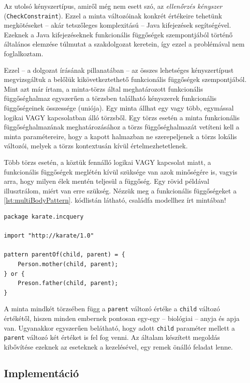 \begin{sloppypar}
Az utolsó kényszertípus, amiről még nem esett szó, az \emph{ellenőrzés kényszer} (\texttt{CheckConstraint}).
Ezzel a minta változóinak konkrét értékeire tehetünk megkötéseket -- akár tetszőleges komplexitású -- Java kifejezések segítségével.
Ezeknek a Java kifejezéseknek funkcionális függőségek szempontjából történő általános elemzése túlmutat a szakdolgozat keretein, így ezzel a problémával nem foglalkoztam.
\end{sloppypar}

Ezzel -- a dolgozat írásának pillanatában -- az összes lehetséges kényszertípust megvizsgáltuk a belőlük kikövetkeztethető funkcionális függőségek szempontjából.
Mint azt már írtam, a minta-törzs által meghatározott funkcionális függőséghalmaz egyszerűen a törzsben található kényszerek funkcionális függőségeinek összessége (uniója).
Egy minta állhat egy vagy több, egymással logikai VAGY kapcsolatban álló törzsből.
Egy törzs esetén a minta funkcionális függőséghalmazának meghatározásához a törzs függőséghalmazát vetíteni kell a minta paramétereire, hogy a kapott halmazban ne szerepeljenek a törzs lokális változói, melyek a törzs kontextusán kívül értelmezhetetlenek.

Több törzs esetén, a köztük fennálló logikai VAGY kapcsolat miatt, a funkcionális függőségek meglétén kívül szüksége van azok minőségére is, vagyis arra, hogy milyen élek mentén teljesül a függőség.
Egy rövid példával illusztrálom, miért van erre szükség.
Nézzük meg a funkcionális függőségeket a \ref{lst:multiBodyPattern}. kódlistán látható, családfa modellhez írt mintában!
\begin{lstlisting}[float,floatplacement=htb,caption=Példa több törzsű mintára,label=lst:multiBodyPattern]
package karate.incquery

import "http://karate/1.0"

pattern parentOf(child, parent) = {
    Person.mother(child, parent);
} or {
    Preson.father(child, parent);
}
\end{lstlisting}
A minta mindkét törzsében függ a \texttt{parent} változó értéke a \texttt{child} változó értékétől, hiszen minden embernek pontosan egy-egy -- biológiai -- anyja és apja van. Ugyanakkor egyszerűen belátható, hogy adott \texttt{child} paraméter mellett a \texttt{parent} változó két értéket is fel fog venni.
Az általam készített megoldás kibővítése ezeknek az eseteknek a kezelésével, egy remek önálló feladat lenne.

\subsection{Implementáció}

